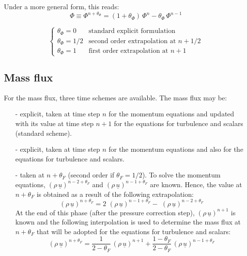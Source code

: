 Under a more general form, this reads:
\begin{equation}
\Phi \equiv \Phi^{n+\theta_{\Phi}}=(1+\theta_{\Phi})\,\Phi^{n}-
\theta_{\Phi}\,\Phi^{n-1}
\end{equation}

\begin{equation}
\left\{%
\begin{array}{ll}
\theta_{\Phi} = 0 & \text{standard explicit formulation} \\
\theta_{\Phi} = 1/2 & \text{second order extrapolation at } n+1/2 \\
\theta_{\Phi} = 1 & \text{first order extrapolation at } n+1%
\end{array}
\right.
\end{equation}

\subsection{Mass flux}

For the mass flux, three time schemes are available. The mass flux may be:

\begin{itemize}
\item[-] explicit, taken at time step $n$ for the momentum equations and
updated with its value at time step $n+1$ for the equations for turbulence
and scalars (standard scheme).\newline

\item[-] explicit, taken at time step $n$ for the momentum equations and
also for the equations for turbulence and scalars.

\item[-] taken at $n+\theta_{F}$ (second order if $\theta_{F}=1/2$). To
solve the momentum equations, $(\rho\,\underline{u})^{n-2+\theta_{F}}$ and $%
(\rho\,\underline{u})^{n-1+\theta_{F}}$ are known. Hence, the value at $%
n+\theta_{F}$ is obtained as a result of the following extrapolation:
\begin{equation}
(\rho\,\underline{u})^{n+\theta_{F}}= 2\,\,(\rho\,\underline{u}%
)^{n-1+\theta_{F}} -\,\,(\rho\,\underline{u})^{n-2+\theta_{F}}
\end{equation}
At the end of this phase (after the pressure correction step), $(\rho\,%
\underline{u})^{n+1}$ is known and the following interpolation is used to
determine the mass flux at $n+\theta_{F}$ that will be adopted for the
equations for turbulence and scalars:
\begin{equation}
(\rho\,\underline{u})^{n+\theta_{F}}= \frac{1}{2-\theta_{F}}\,(\rho\,%
\underline{u})^{n+1} +\frac{1-\theta_{F}}{2-\theta_{F}}\,(\rho\,\underline{u}%
)^{n-1+\theta_{F}}
\end{equation}
\end{itemize}

